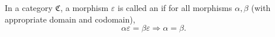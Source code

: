 In a category $\mathfrak{C}$, a morphism $\varepsilon$ is called an  if for all morphisms $\alpha, \beta$ (with appropriate domain and codomain),
$$\alpha \varepsilon = \beta \varepsilon \Rightarrow \alpha = \beta.$$
